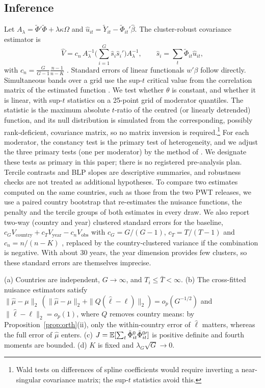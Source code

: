 \documentclass[preprint,12pt,authoryear]{elsarticle}
\begin{document}
\subsection{Inference}

Let $A_\lambda=\tilde\Phi'\tilde\Phi+\lambda\kappa\Omega$ and $\hat u_{it}=\tilde Y_{it}-\tilde\Phi_{it}'\hat\beta$. The cluster-robust covariance estimator is
\begin{equation}
\hat V=c_n\,A_\lambda^{-1}\Big(\sum_{i=1}^G \hat s_i\hat s_i'\Big)A_\lambda^{-1},\qquad \hat s_i=\sum_t\tilde\Phi_{it}\hat u_{it},
\label{eq:vcov}
\end{equation}
with $c_n=\frac{G}{G-1}\frac{n-1}{n-K}$ \citep{cameron2015cluster}. Standard errors of linear functionals $w'\beta$ follow directly. Simultaneous bands over a grid use the sup-$t$ critical value from the correlation matrix of the estimated function \citep{montiel2019bands}. We test whether $\theta$ is constant, and whether it is linear, with sup-$t$ statistics on a 25-point grid of moderator quantiles. The statistic is the maximum absolute $t$-ratio of the centred (or linearly detrended) function, and its null distribution is simulated from the corresponding, possibly rank-deficient, covariance matrix, so no matrix inversion is required.\footnote{Wald tests on differences of spline coefficients would require inverting a near-singular covariance matrix; the sup-$t$ statistics avoid this.} For each moderator, the constancy test is the primary test of heterogeneity, and we adjust the three primary tests (one per moderator) by the method of \citet{holm1979}. We designate these tests as primary in this paper; there is no registered pre-analysis plan. Tercile contrasts and BLP slopes are descriptive summaries, and robustness checks are not treated as additional hypotheses. To compare two estimates computed on the same countries, such as those from the two PWT releases, we use a paired country bootstrap that re-estimates the nuisance functions, the penalty and the tercile groups of both estimates in every draw. We also report two-way (country and year) clustered standard errors for the baseline, $c_GV_{\text{country}}+c_TV_{\text{year}}-c_nV_{\text{obs}}$ with $c_G=G/(G-1)$, $c_T=T/(T-1)$ and $c_n=n/(n-K)$ \citep{cameron2011twoway}, replaced by the country-clustered variance if the combination is negative. With about 30 years, the year dimension provides few clusters, so these standard errors are themselves imprecise.

\begin{assumption}[Regularity]\label{as:reg}
(a) Countries are independent, $G\to\infty$, and $T_i\le\bar T<\infty$. (b) The cross-fitted nuisance estimators satisfy $\|\hat\mu-\mu\|_2\,(\|\hat\mu-\mu\|_2+\|Q(\hat\ell-\ell)\|_2)=o_p(G^{-1/2})$ and $\|\hat\ell-\ell\|_2=o_p(1)$, where $Q$ removes country means: by Proposition~\ref{prop:orth}(ii), only the within-country error of $\hat\ell$ matters, whereas the full error of $\hat\mu$ enters. (c) $J=\mathbb{E}[\sum_t\tilde\Phi^0_{it}\tilde\Phi^{0\prime}_{it}]$ is positive definite and fourth moments are bounded. (d) $K$ is fixed and $\lambda_G\sqrt G\to0$.
\end{assumption}
\end{document}
